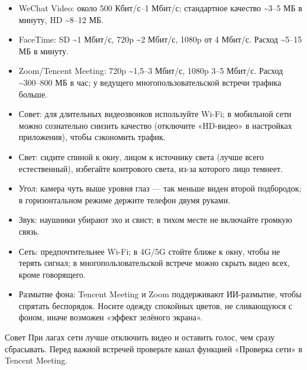 
\begin{itemize}
  \item WeChat Video: около 500 Кбит/с–1 Мбит/с; стандартное качество \textasciitilde{}3–5 МБ в минуту, HD \textasciitilde{}8–12 МБ.
  \item FaceTime: SD \textasciitilde{}1 Мбит/с, 720p \textasciitilde{}2 Мбит/с, 1080p от 4 Мбит/с. Расход \textasciitilde{}5–15 МБ в минуту.
  \item Zoom/Tencent Meeting: 720p \textasciitilde{}1,5–3 Мбит/с, 1080p 3–5 Мбит/с. Расход \textasciitilde{}300–800 МБ в час; у ведущего многопользовательской встречи трафика больше.
  \item Совет: для длительных видеозвонков используйте Wi-Fi; в мобильной сети можно сознательно снизить качество (отключите «HD-видео» в настройках приложения), чтобы сэкономить трафик.
\end{itemize}


\begin{itemize}
  \item Свет: сидите спиной к окну, лицом к источнику света (лучше всего естественный), избегайте контрового света, из-за которого лицо темнеет.
  \item Угол: камера чуть выше уровня глаз — так меньше виден второй подбородок; в горизонтальном режиме держите телефон двумя руками.
  \item Звук: наушники убирают эхо и свист; в тихом месте не включайте громкую связь.
  \item Сеть: предпочтительнее Wi-Fi; в 4G/5G стойте ближе к окну, чтобы не терять сигнал; в многопользовательской встрече можно скрыть видео всех, кроме говорящего.
  \item Размытие фона: Tencent Meeting и Zoom поддерживают ИИ-размытие, чтобы спрятать беспорядок. Носите одежду спокойных цветов, не сливающуюся с фоном, иначе возможен «эффект зелёного экрана».
\end{itemize}

\begin{tcbinfo}{Совет}
При лагах сети лучше отключить видео и оставить голос, чем сразу сбрасывать. Перед важной встречей проверьте канал функцией «Проверка сети» в Tencent Meeting.

\end{tcbinfo}


